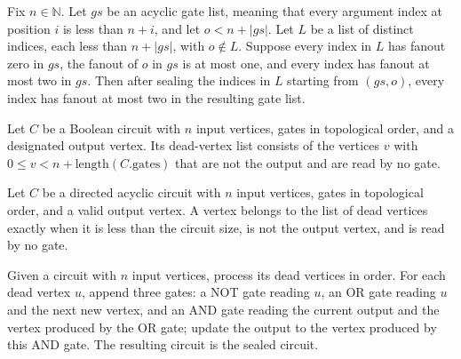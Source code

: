 \begin{theorem}
\label{BoolCircuit.sealGates_fanout}
\leanok
{}
Fix $n\in\mathbb{N}$. Let $gs$ be an acyclic gate list, meaning that every argument
index at position $i$ is less than $n+i$, and let $o<n+|gs|$. Let $L$ be a list of
distinct indices, each less than $n+|gs|$, with $o\notin L$. Suppose every index in $L$
has fanout zero in $gs$, the fanout of $o$ in $gs$ is at most one, and every index has
fanout at most two in $gs$. Then after sealing the indices in $L$ starting from
$(gs,o)$, every index has fanout at most two in the resulting gate list.
\end{theorem}

\begin{definition}
\label{BoolCircuit.DAGCircuit.deadVertices}
\leanok
{}
Let $C$ be a Boolean circuit with $n$ input vertices, gates in topological order, and a
designated output vertex. Its dead-vertex list consists of the vertices $v$ with $0 \le
v < n + \mathrm{length}(C.\mathrm{gates})$ that are not the output and are read by no
gate.
\end{definition}

\begin{theorem}
\label{BoolCircuit.DAGCircuit.mem_deadVertices}
\leanok
{}
Let $C$ be a directed acyclic circuit with $n$ input vertices, gates in topological
order, and a valid output vertex. A vertex belongs to the list of dead vertices exactly
when it is less than the circuit size, is not the output vertex, and is read by no gate.
\end{theorem}

\begin{definition}
\label{BoolCircuit.DAGCircuit.seal}
\leanok
{}
Given a circuit with $n$ input vertices, process its dead vertices in order. For each
dead vertex $u$, append three gates: a NOT gate reading $u$, an OR gate reading $u$ and
the next new vertex, and an AND gate reading the current output and the vertex produced
by the OR gate; update the output to the vertex produced by this AND gate. The resulting
circuit is the sealed circuit.
\end{definition}

